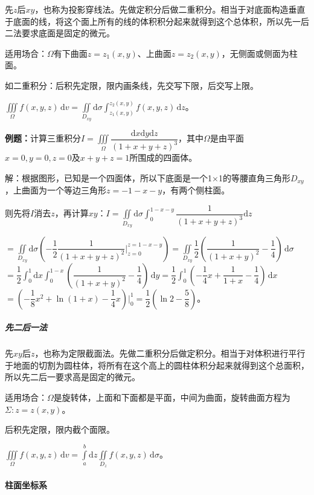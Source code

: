 先$z$后$xy$，也称为投影穿线法。先做定积分后做二重积分。相当于对底面构造垂直于底面的线，将这个面上所有的线的体积积分起来就得到这个总体积，所以先一后二法要求底面是固定的微元。

适用场合：$\Omega$有下曲面$z=z_1(x,y)$、上曲面$z=z_2(x,y)$，无侧面或侧面为柱面。

如二重积分：后积先定限，限内画条线，先交写下限，后交写上限。

$\iiint\limits_\Omega f(x,y,z)\,\textrm{d}v=\iint\limits_{D_{xy}}\textrm{d}\sigma\int_{z_1(x,y)}^{z_2(x,y)}f(x,y,z)\,\textrm{d}z$。

\textbf{例题：}计算三重积分$I=\displaystyle{\iiint\limits_\Omega\dfrac{\textrm{d}x\textrm{d}y\textrm{d}z}{(1+x+y+z)^3}}$，其中$\Omega$是由平面$x=0,y=0,z=0$及$x+y+z=1$所围成的四面体。

解：根据图形，已知是一个四面体，所以下底面是一个1×1的等腰直角三角形$D_{xy}$，上曲面为一个等边三角形$z=-1-x-y$，有两个侧柱面。

则先将$I$消去$z$，再计算$xy$：$I=\displaystyle{\iint\limits_{D_{xy}}\textrm{d}\sigma\int_0^{1-x-y}\dfrac{1}{(1+x+y+z)^3}\textrm{d}z}$

$=\displaystyle{\iint\limits_{D_{xy}}\textrm{d}\sigma\left(-\dfrac{1}{2}\dfrac{1}{(1+x+y+z)^2}\bigg|_{z=0}^{z=1-x-y}\right)}=\displaystyle{\iint\limits_{D_{xy}}\dfrac{1}{2}\left(\dfrac{1}{(1+x+y)^2}-\dfrac{1}{4}\right)\,\textrm{d}\sigma}$\\$=\dfrac{1}{2}\int_0^1\textrm{d}x\int_0^{1-x}\left(\dfrac{1}{(1+x+y)^2}-\dfrac{1}{4}\right)\,\textrm{d}y=\dfrac{1}{2}\displaystyle{\int_0^1\left(-\dfrac{1}{4}x+\dfrac{1}{1+x}-\dfrac{1}{4}\right)\,\textrm{d}x}$\\$=\left(-\dfrac{1}{8}x^2+\ln(1+x)-\dfrac{1}{4}x\right)\bigg|_0^1=\dfrac{1}{2}\left(\ln2-\dfrac{5}{8}\right)$。

\subparagraph{先二后一法} \leavevmode \medskip

先$xy$后$z$，也称为定限截面法。先做二重积分后做定积分。相当于对体积进行平行于地面的切割为圆柱体，将所有在这个高上的圆柱体积分起来就得到这个总面积，所以先二后一要求高是固定的微元。

适用场合：$\Omega$是旋转体，上面和下面都是平面，中间为曲面，旋转曲面方程为$\Sigma:z=z(x,y)$。

后积先定限，限内截个面限。

$\iiint\limits_\Omega f(x,y,z)\,\textrm{d}v=\int\limits_a^b\textrm{d}z\iint\limits_{D_z}f(x,y,z)\,\textrm{d}\sigma$。

\paragraph{柱面坐标系} \leavevmode \medskip

